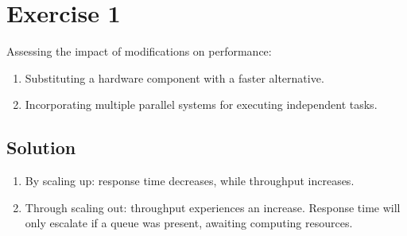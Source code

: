 \section{Exercise 1}

Assessing the impact of modifications on performance:
\begin{enumerate}
    \item Substituting a hardware component with a faster alternative.
    \item Incorporating multiple parallel systems for executing independent tasks.
\end{enumerate}

\subsection*{Solution}
\begin{enumerate}
    \item By scaling up: response time decreases, while throughput increases.
    \item Through scaling out: throughput experiences an increase.
        Response time will only escalate if a queue was present, awaiting computing resources.
\end{enumerate}